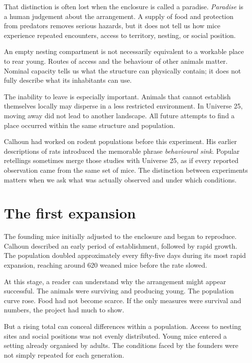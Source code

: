 \documentclass[12pt,a4paper]{book}
\begin{document}
That distinction is often lost when the enclosure is called a paradise. \emph{Paradise} is a human judgement about the arrangement. A supply of food and protection from predators removes serious hazards, but it does not tell us how mice experience repeated encounters, access to territory, nesting, or social position.

An empty nesting compartment is not necessarily equivalent to a workable place to rear young. Routes of access and the behaviour of other animals matter. Nominal capacity tells us what the structure can physically contain; it does not fully describe what its inhabitants can use.

The inability to leave is especially important. Animals that cannot establish themselves locally may disperse in a less restricted environment. In Universe 25, moving away did not lead to another landscape. All future attempts to find a place occurred within the same structure and population.

Calhoun had worked on rodent populations before this experiment. His earlier descriptions of rats introduced the memorable phrase \emph{behavioural sink}. Popular retellings sometimes merge those studies with Universe 25, as if every reported observation came from the same set of mice. The distinction between experiments matters when we ask what was actually observed and under which conditions.

\section*{The first expansion}

The founding mice initially adjusted to the enclosure and began to reproduce. Calhoun described an early period of establishment, followed by rapid growth. The population doubled approximately every fifty-five days during its most rapid expansion, reaching around 620 weaned mice before the rate slowed.

At this stage, a reader can understand why the arrangement might appear successful. The animals were surviving and producing young. The population curve rose. Food had not become scarce. If the only measures were survival and numbers, the project had much to show.

But a rising total can conceal differences within a population. Access to nesting sites and social positions was not evenly distributed. Young mice entered a setting already organised by adults. The conditions faced by the founders were not simply repeated for each generation.
\end{document}
